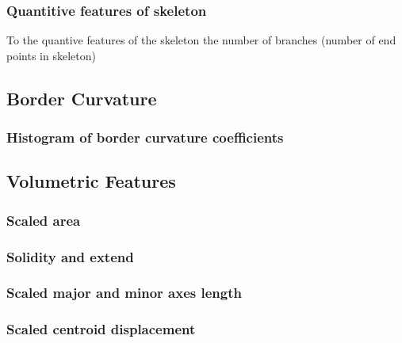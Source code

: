 \documentclass[12pt]{article}
\begin{document}
\subsubsection{Quantitive features of skeleton}
To the quantive features of the skeleton the number of branches (number of end points in skeleton)

\subsection{Border Curvature}
\subsubsection{Histogram of border curvature coefficients}

\subsection{Volumetric Features}
\subsubsection{Scaled area}
\subsubsection{Solidity and extend}
\subsubsection{Scaled major and minor axes length}
\subsubsection{Scaled centroid displacement}
\end{document}

